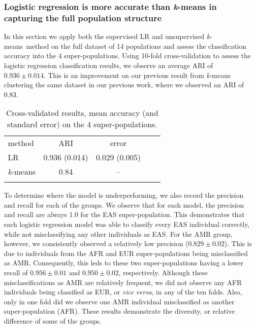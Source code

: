 \documentclass{llncs}
\newcommand{\kMeans}{\textit{k}-means}
\begin{document}
{\subsubsection{Logistic regression is more accurate than \kMeans{} in capturing the full population structure}
In this section we apply both the supervised LR and unsupervised \kMeans\ method on the full dataset of 14 populations and assess the 
classification accuracy into the 4 super-populations.
Using 10-fold cross-validation to assess the logistic regression classification results, we observe an average ARI of \(0.936 \pm{} 0.014\).
This is an improvement on our previous result from \kMeans{} clustering the same dataset in our previous work, where we observed an ARI of \(0.83\).

\begin{table}
\caption{Cross-validated results, mean accuracy (and standard error) on the 4 super-populations.}
\begin{center}
\renewcommand{\arraystretch}{1.4}
\setlength\tabcolsep{3pt}
\begin{tabular}{lcccc}
\hline\noalign{\smallskip}
method  & ARI & error \\
LR  & 0.936 (0.014) & 0.029 (0.005) \\
\kMeans & 0.84 & -- \\
\noalign{\smallskip}
\hline
\end{tabular}
\end{center}
\end{table}

To determine where the model is underperforming, we also record the precision and recall for each of the groups.
We observe that for each model, the precision and recall are always 1.0 for the EAS super-population.
This demonstrates that each logistic regression model was able to classify every EAS individual correctly, while not misclassifying any other individuals as EAS.
For the AMR group, however, we consistently observed a relatively low precision (\(0.829 \pm{} 0.02 \)).
This is due to individuals from the AFR and EUR super-populations being misclassified as AMR.
Consequently, this leds to these two super-populations having a lower recall of \(0.956 \pm 0.01 \) and \(0.950 \pm 0.02 \), respectively.
Although these misclassifications as AMR are relatively frequent, we did not observe any AFR individuals being classified as EUR, or {\it vice versa}, in any of the ten folds.
Also, only in one fold did we observe one AMR individual misclassified as another super-population (AFR).
These results demonstrate the diversity, or relative difference of some of the groups. 

}
\end{document}
